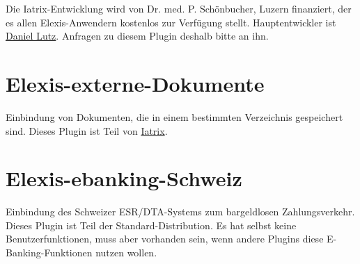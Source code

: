  Die Iatrix-Entwicklung wird von Dr. med. P. Schönbucher, Luzern finanziert, der es allen Elexis-Anwendern kostenlos zur Verfügung stellt. Hauptentwickler ist \href{http://www.elexis.ch/jp/component/option,com_contact/task,view/contact_id,2/Itemid,32/}{Daniel Lutz}. Anfragen zu diesem Plugin deshalb bitte an ihn.

\section{Elexis-externe-Dokumente}
Einbindung von Dokumenten, die in einem bestimmten Verzeichnis gespeichert sind. Dieses Plugin ist Teil von \href{http://www.iatrix.org}{Iatrix}.

\section{Elexis-ebanking-Schweiz}
Einbindung des Schweizer ESR/DTA-Systems zum bargeldlosen Zahlungsverkehr. Dieses Plugin ist Teil der Standard-Distribution. Es hat selbst keine Benutzerfunktionen, muss aber vorhanden sein, wenn andere Plugins diese E-Banking-Funktionen nutzen wollen.



